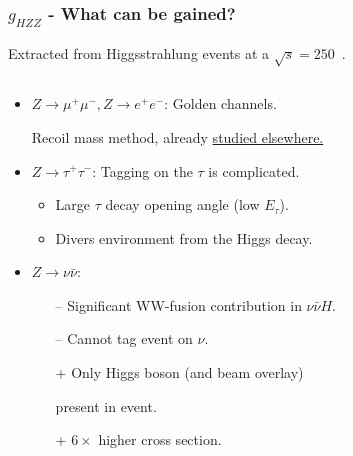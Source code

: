 
\begin{frame}
  \frametitle{$g_{HZZ}$ - What can be gained?}
  Extracted from Higgsstrahlung events at a $\sqrt{s}=250$~\GeV.
  \begin{columns}[c,onlytextwidth]
  \begin{column}{0.60\textwidth}
  \begin{itemize}
    \item $Z \rightarrow \mu^+ \mu^-, Z \rightarrow e^+ e^-$:
          Golden channels.

          Recoil mass method, already {\color{llblue}
            \href{https://arxiv.org/abs/1604.07524}{studied elsewhere.}}
    \item $Z \rightarrow \tau^+ \tau^-$:
        Tagging on the $\tau$ is complicated.
        \begin{itemize}
          \item Large $\tau$ decay opening angle (low $E_\tau$).
          \item Divers environment from the Higgs decay.
        \end{itemize}
    \item $Z \rightarrow \nu\bar{\nu}$:
      \begin{itemize}
        \item[--] Significant WW-fusion contribution in $\nu\bar{\nu}H$.
        \item[--] Cannot tag event on $\nu$.
        \item[+]  Only Higgs boson (and beam overlay)

            present in event.
        \item[+]  $6\times$ higher cross section.
      \end{itemize}
  \end{itemize}
  \end{column}
  \begin{column}{0.40\textwidth}
    \resizebox{\textwidth}{!}{
      
    }
  \end{column}
  \end{columns}
  \end{frame}



